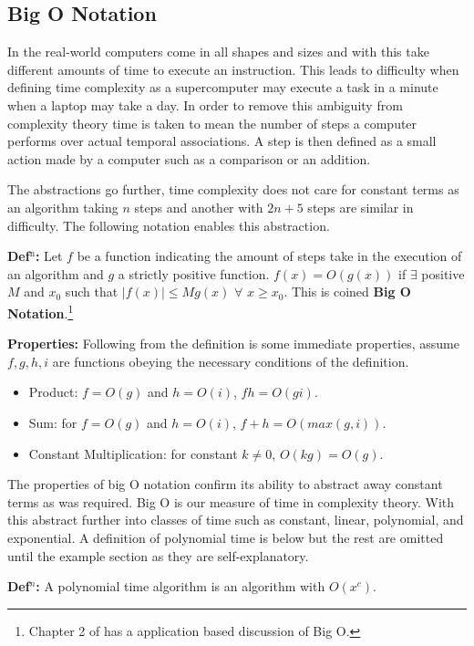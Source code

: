 \documentclass[a4paper,11pt]{report}
\begin{document}
\subsection{Big O Notation}

In the real-world computers come in all shapes and sizes and with this take different amounts of time to execute an instruction. This leads to difficulty when defining time complexity as a supercomputer may execute a task in a minute when a laptop may take a day. In order to remove this ambiguity from complexity theory time is taken to mean the number of steps a computer performs over actual temporal associations. A step is then defined as a small action made by a computer such as a comparison or an addition. 

The abstractions go further, time complexity does not care for constant terms as an algorithm taking $n$ steps and another with $2n+5$ steps are similar in difficulty. The following notation enables this abstraction.

\textbf{Def$^\text{n}$:} Let $f$ be a function indicating the amount of steps take in the execution of an algorithm and $g$ a strictly positive function. $f(x)=O (g(x))$ if $\exists$ positive $ M$ and $x_0$ such that $|f(x)|\leq Mg(x)$ $\forall$ $x\geq x_0$. This is coined \textbf{Big O Notation}.\footnote{Chapter 2 of \cite{salomaa1985computation} has a application based discussion of Big O.}

\textbf{Properties:} Following from the definition is some immediate properties, assume $f,g,h,i$ are functions obeying the necessary conditions of the definition.
\begin{itemize}
\item Product: $f=O(g)$ and $h=O(i)$, $fh=O(gi)$.
\item Sum: for $f=O(g)$ and $h=O(i)$, $f+h = O(max(g,i))$.
\item Constant Multiplication: for constant $k\neq0$, $O(kg)=O(g)$.
\end{itemize}

The properties of big O notation confirm its ability to abstract away constant terms as was required. Big O is our measure of time in complexity theory. With this abstract further into classes of time such as constant, linear, polynomial, and exponential. A definition of polynomial time is below but the rest are omitted until the example section as they are self-explanatory.

\textbf{Def$^n$:} A polynomial time algorithm is an algorithm with $O(x^c)$.
\end{document}
